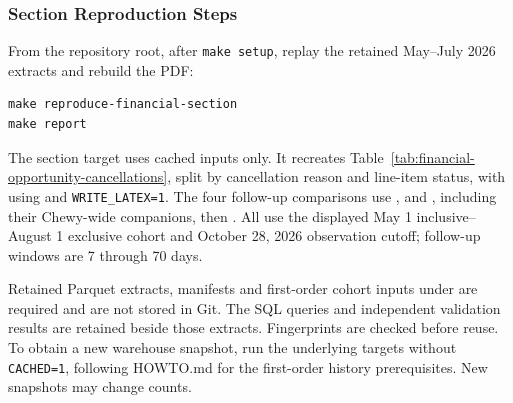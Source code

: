 \clearpage
\subsubsection{Section Reproduction Steps}\label{subsubsec:reproduce-financial}
From the repository root, after \texttt{make setup}, replay the retained May--July
2026 extracts and rebuild the PDF:
\begin{lstlisting}[basicstyle=\ttfamily\small,breaklines=true]
make reproduce-financial-section
make report
\end{lstlisting}
The section target uses cached inputs only. It recreates
Table~\ref{tab:financial-opportunity-cancellations}, split by cancellation reason
and line-item status, with
 using
 and \texttt{WRITE\_LATEX=1}.
The four follow-up comparisons use
,
 and
, including their Chewy-wide
companions, then .
All use the displayed May 1 inclusive--August 1 exclusive cohort and October 28,
2026 observation cutoff; follow-up windows are 7 through 70 days.

Retained Parquet extracts, manifests and first-order cohort inputs under
 are required and are not stored in Git.
The SQL queries and independent validation results are retained beside those extracts.
Fingerprints are checked before reuse. To obtain a new warehouse snapshot,
run the underlying targets without \texttt{CACHED=1}, following HOWTO.md for the
first-order history prerequisites. New snapshots may change counts.
